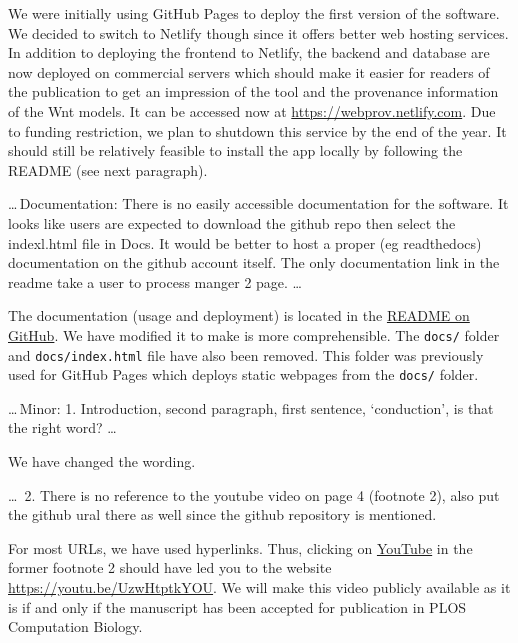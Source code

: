\documentclass{article}
\begin{document}
We were initially using GitHub Pages to deploy the first version of the software. We decided to switch to Netlify though since it offers better web hosting services.
In addition to deploying the frontend to Netlify, the backend and database are now deployed on commercial servers which should make it easier for readers of the publication to get an impression of the tool and the provenance information of the Wnt models.
It can be accessed now at \url{https://webprov.netlify.com}.
Due to funding restriction, we plan to shutdown this service by the end of the year.
It should still be relatively feasible to install the app locally by following the README (see next paragraph).


\begin{mdframed}
\ldots\,Documentation: There is no easily accessible documentation for the software. It looks like users are expected to download the github repo then select the indexl.html file in Docs. It would be better to host a proper (eg readthedocs) documentation on the github account itself. The only documentation link in the readme take a user to process manger 2 page. \ldots
\end{mdframed}


The documentation (usage and deployment) is located in the \href{https://github.com/SFB-ELAINE/WebProv#readme}{README on GitHub}.
We have modified it to make is more comprehensible.
The \texttt{docs/} folder and \texttt{docs/index.html} file have also been removed.
This folder was previously used for GitHub Pages which deploys static webpages from the \texttt{docs/} folder.

\begin{mdframed}
\ldots\,Minor:
1. Introduction, second paragraph, first sentence, ‘conduction’, is that the right word? \ldots
\end{mdframed}

We have changed the wording.

\begin{mdframed}
\ldots\, 2. There is no reference to the youtube video on page 4 (footnote 2), also put the github ural there as well since the github repository is mentioned.
\end{mdframed}

For most URLs, we have used hyperlinks.
Thus, clicking on \href{https://youtu.be/UzwHtptkYOU}{YouTube} in the former footnote 2 should have led you to the website \url{https://youtu.be/UzwHtptkYOU}.
We will make this video publicly available as it is if and only if the manuscript has been accepted for publication in PLOS Computation Biology.
\end{document}
